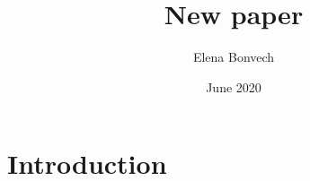 \documentclass{article}
\title{New paper}
\author{Elena Bonvech}
\date{June 2020}
\begin{document}
\maketitle

\section{Introduction}
\end{document}
